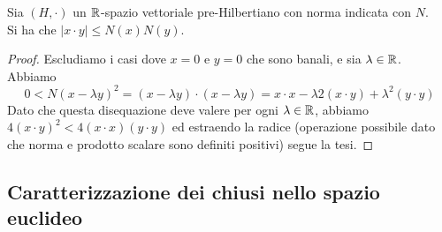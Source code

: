 \documentclass{article}
\begin{document}
\begin{theorem}{}{}
    Sia $(H,\cdot)$ un $\mathbb{R}$-spazio vettoriale pre-Hilbertiano con norma indicata con $N$.\\ 
    Si ha che $|x \cdot y|\le N(x)N(y)$.
\end{theorem}
\begin{proof}
    Escludiamo i casi dove $x=0$ e $y=0$ che sono banali, e sia $\lambda \in \mathbb{R}$.\\
    Abbiamo \[0 < N(x-\lambda y)^2 = (x-\lambda y)\cdot (x-\lambda y) = x\cdot x - \lambda 2 (x\cdot y) + \lambda^2 (y\cdot y)\]
    Dato che questa disequazione deve valere per ogni $\lambda \in \mathbb{R}$, abbiamo $4(x\cdot y)^2 < 4(x\cdot x)(y\cdot y)$ ed estraendo la radice (operazione possibile dato che norma e prodotto scalare sono definiti positivi) segue la tesi.
\end{proof}

\subsection{Caratterizzazione dei chiusi nello spazio euclideo}
\end{document}
